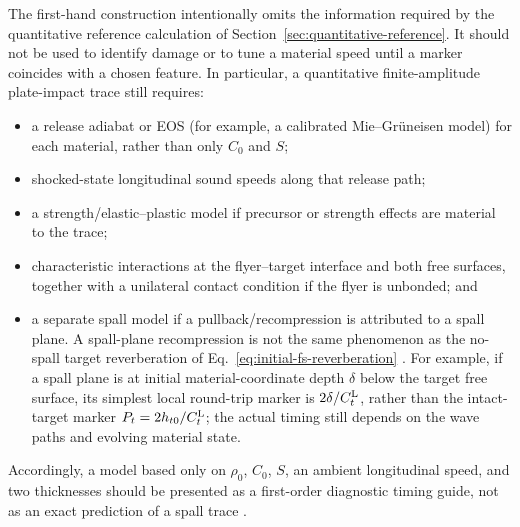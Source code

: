 \documentclass[11pt]{article}
\newcommand{\rhoz}[1][]{\rho_{0#1}}
\newcommand{\Pt}{P_t}
\begin{document}
The first-hand construction intentionally omits the information required by
the quantitative reference calculation of Section~\ref{sec:quantitative-reference}.
It should not be used to identify damage or to tune a material speed until a
marker coincides with a chosen feature.  In particular, a quantitative
finite-amplitude plate-impact trace still requires:
\begin{itemize}
  \item a release adiabat or EOS (for example, a calibrated Mie--Gr\"uneisen
        model) for each material, rather than only $C_0$ and $S$;
  \item shocked-state longitudinal sound speeds along that release path;
  \item a strength/elastic--plastic model if precursor or strength effects are
        material to the trace;
  \item characteristic interactions at the flyer--target interface and both
        free surfaces, together with a unilateral contact condition if the
        flyer is unbonded; and
  \item a separate spall model if a pullback/recompression is attributed to a
        spall plane.  A spall-plane recompression is not the same phenomenon as
        the no-spall target reverberation of Eq.~\eqref{eq:initial-fs-reverberation}
        \cite{Hawkins2020}.  For example, if a spall plane is at initial
        material-coordinate depth $\delta$ below the target free surface, its simplest local
        round-trip marker is $2\delta/\CL[t]$, rather than the intact-target
        marker $\Pt=2h_{t0}/\CL[t]$; the actual timing still depends on the
        wave paths and evolving material state.
\end{itemize}

Accordingly, a model based only on $\rhoz$, $C_0$, $S$, an ambient longitudinal
speed, and two thicknesses should be presented as a first-order diagnostic
timing guide, not as an exact prediction of a spall trace
\cite{Kerley2008,Hawreliak2024,Hawkins2020}.
\end{document}
